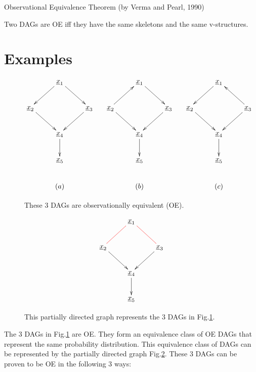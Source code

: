 \begin{claim}Observational Equivalence
Theorem (by Verma and Pearl, 1990)

Two DAGs are
OE
iff they
have the same
skeletons and
the same v-structures.
\end{claim}

\section{Examples}

\begin{figure}[h!]
$$\xymatrix{
&\rvx_1
\ar[dl]
\ar[dr]
\\
\rvx_2\ar[dr]
&&\rvx_3\ar[dl]
\\
&\rvx_4\ar[d]
\\
&\rvx_5
\\
&(a)
}
\;\;\;\;\;
\xymatrix{
&\rvx_1
\ar[dr]
\\
\rvx_2\ar[dr]\ar[ur]
&&\rvx_3\ar[dl]
\\
&\rvx_4\ar[d]
\\
&\rvx_5
\\
&(b)
}
\;\;\;\;\;
\xymatrix{
&\rvx_1
\ar[dl]
\\
\rvx_2\ar[dr]
&&\rvx_3\ar[dl]\ar[ul]
\\
&\rvx_4\ar[d]
\\
&\rvx_5
\\
&(c)
}$$
\caption{These 3 DAGs are 
observationally equivalent (OE).}
\label{fig-obs-equi-eg}
\end{figure}
\begin{figure}[h!]
$$
\xymatrix{
&\rvx_1
\ar@[red]@{-}[dl]\ar@[red]@{-}[dr]
\\
\rvx_2\ar[dr]
&&\rvx_3\ar[dl]
\\
&\rvx_4\ar[d]
\\
&\rvx_5
}$$
\caption{This partially
directed graph 
represents the 3 
DAGs
in Fig.\ref{fig-obs-equi-eg}.}
\label{fig-pdag1}
\end{figure}

The 3 DAGs
in Fig.\ref{fig-obs-equi-eg}
are OE. They form an equivalence
class of OE DAGs
that represent
the same probability distribution.
This
equivalence
class of DAGs
can be represented
by the partially 
directed graph 
Fig.\ref{fig-pdag1}.
These 3 DAGs 
can be proven to 
be OE
in the following 3 ways:


